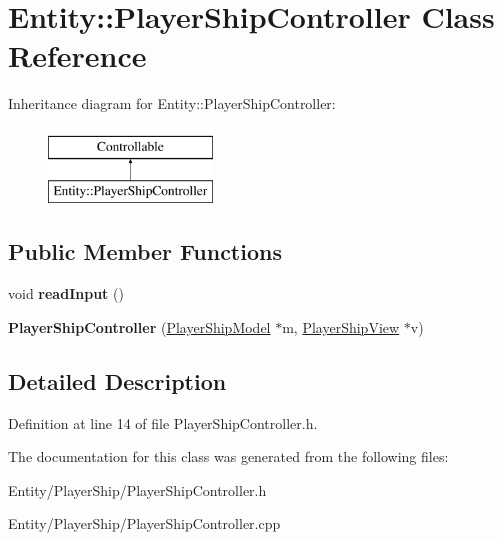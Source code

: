 \hypertarget{classEntity_1_1PlayerShipController}{}\section{Entity\+:\+:Player\+Ship\+Controller Class Reference}
\label{classEntity_1_1PlayerShipController}
Inheritance diagram for Entity\+:\+:Player\+Ship\+Controller\+:\begin{figure}[H]
\begin{center}
\leavevmode
\includegraphics[height=2.000000cm]{classEntity_1_1PlayerShipController}
\end{center}
\end{figure}
\subsection*{Public Member Functions}
\begin{DoxyCompactItemize}
\item 
\mbox{\label{classEntity_1_1PlayerShipController_a5bb5ec6d9262030be9375ffc8434c896}} 
void {\bfseries read\+Input} ()
\item 
\mbox{\label{classEntity_1_1PlayerShipController_ac137389e2a1ba192ad747df7deac5c7c}} 
{\bfseries Player\+Ship\+Controller} (\hyperlink{classEntity_1_1PlayerShipModel}{Player\+Ship\+Model} $\ast$m, \hyperlink{classEntity_1_1PlayerShipView}{Player\+Ship\+View} $\ast$v)
\end{DoxyCompactItemize}


\subsection{Detailed Description}


Definition at line 14 of file Player\+Ship\+Controller.\+h.



The documentation for this class was generated from the following files\+:\begin{DoxyCompactItemize}
\item 
Entity/\+Player\+Ship/Player\+Ship\+Controller.\+h\item 
Entity/\+Player\+Ship/Player\+Ship\+Controller.\+cpp\end{DoxyCompactItemize}
